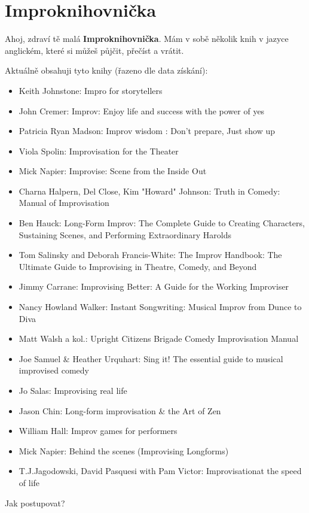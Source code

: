 \needspace{5cm} \section{Improknihovnička} \label{improknihovnička} Ahoj, 
zdraví tě malá \textbf{Improknihovnička}{}. 
Mám v sobě několik knih v jazyce anglickém, které si můžeš půjčit, přečíst a vrátit. 
  
Aktuálně obsahuji tyto knihy (řazeno dle data získání): 
\begin{itemize}
\item Keith Johnstone: Impro for storytellers
\item John Cremer: Improv: Enjoy life and success with the power of yes
\item Patricia Ryan Madson: Improv wisdom : Don't prepare, Just show up
\item Viola Spolin: Improvisation for the Theater
\item Mick Napier: Improvise: Scene from the Inside Out
\item Charna Halpern, Del Close, Kim "Howard"{} Johnson: Truth in Comedy: Manual of Improvisation
\item Ben Hauck: Long-Form Improv: The Complete Guide to Creating Characters, Sustaining Scenes, and Performing Extraordinary Harolds
\item Tom Salinsky and Deborah Francis-White: The Improv Handbook: The Ultimate Guide to Improvising in Theatre, Comedy, and Beyond
\item Jimmy Carrane: Improvising Better: A Guide for the Working Improviser
\item Nancy Howland Walker: Instant Songwriting: Musical Improv from Dunce to Diva
\item Matt Walsh a kol.: Upright Citizens Brigade Comedy Improvisation Manual
\item Joe Samuel & Heather Urquhart: Sing it! The essential guide to musical improvised comedy
\item Jo Salas: Improvising real life
\item Jason Chin: Long-form improvisation & the Art of Zen
\item William Hall: Improv games for performers
\item Mick Napier: Behind the scenes (Improvising Longforms)
\item T.J.Jagodowski, David Pasquesi with Pam Victor: Improvisationat the speed of life
\end{itemize}
 
 
Jak postupovat? 
 
